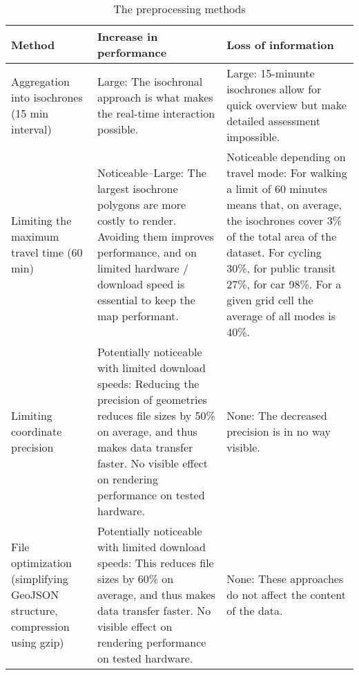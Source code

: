 \begin{table}[H]
	\caption{The preprocessing methods}
	\label{tab:preprocessing methods}
	\centering
	\begin{tabular}{ | L{0.2\textwidth} | L{0.35\textwidth} | L{0.35\textwidth} | }
		\hline
		\textbf{Method}
		& \textbf{Increase in performance}
		& \textbf{Loss of information}
		\\
		\hline
		\hline
		Aggregation into isochrones (15 min interval)
		& Large: The isochronal approach is what makes the real-time interaction possible.
		& Large: 15-minunte isochrones allow for quick overview but make detailed assessment impossible.
		\\
		\hline
		Limiting the maximum travel time (60 min)
		& Noticeable--Large: The largest isochrone polygons are more costly to render.
		Avoiding them improves performance, and on limited hardware / download speed
		is essential to keep the map performant.
		& Noticeable depending on travel mode:
		For walking a limit of 60 minutes means that, on average,
		the isochrones cover 3\% of the total area of the dataset.
		For cycling 30\%, for public transit 27\%, for car 98\%.
		For a given grid cell the average of all modes is 40\%.
		\\
		\hline
		Limiting coordinate precision
		& Potentially noticeable with limited download speeds:
		Reducing the precision of geometries reduces file sizes by 50\% on average,  %
		and thus makes data transfer faster.
		No visible effect on rendering performance on tested hardware.
		& None: The decreased precision is in no way visible.
		\\
		\hline
		File optimization (simplifying GeoJSON structure, compression using gzip)
		& Potentially noticeable with limited download speeds:
		This reduces file sizes by 60\% on average,  %
		and thus makes data transfer faster.
		No visible effect on rendering performance on tested hardware.
		& None: These approaches do not affect the content of the data.
		\\
		\hline
	\end{tabular}
\end{table}
